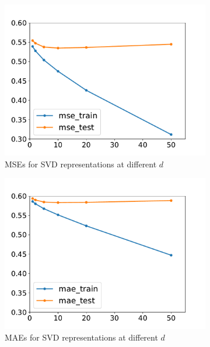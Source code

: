 \documentclass[11pt,letterpaper]{article}
\theoremstyle{definition}
\theoremstyle{plain}
\numberwithin{equation}{section}
\numberwithin{figure}{section}
\begin{document}
\begin{enumerate}
\begin{enumerate}
		\begin{figure}[H]
			\centering
			\begin{subfigure}[t]{0.48\textwidth}
			\centering
			\includegraphics[width=\textwidth]{figures/svd_mse.pdf}
			\caption{MSEs for SVD representations at different $d$}
			\end{subfigure}
			\begin{subfigure}[t]{0.48\textwidth}
			\centering
			\includegraphics[width=\textwidth]{figures/svd_mae.pdf}
			\caption{MAEs for SVD representations at different $d$}
			\end{subfigure}
			\caption{}\label{fig:svd}
		\end{figure}



\end{enumerate}
\end{enumerate}
\end{document}
